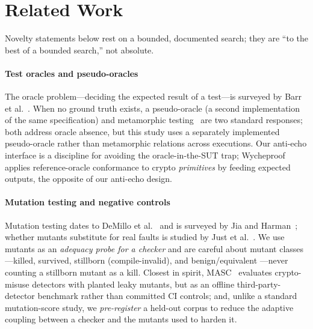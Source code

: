 \documentclass[conference]{IEEEtran}
\begin{document}
\section{Related Work}
\label{sec:related}
Novelty statements below rest on a bounded, documented search; they are ``to the best of a
bounded search,'' not absolute.

\paragraph{Test oracles and pseudo-oracles}
The oracle problem---deciding the expected result of a test---is surveyed by Barr et
al.~\cite{oracleproblem}. When no ground truth exists, a pseudo-oracle (a second
implementation of the same specification) and metamorphic testing~\cite{metamorphic} are two
standard responses; both address oracle absence, but this study uses a separately implemented
pseudo-oracle rather than metamorphic relations across executions. Our anti-echo interface is
a discipline for avoiding the oracle-in-the-SUT trap; Wycheproof applies reference-oracle
conformance to crypto \emph{primitives} by feeding expected outputs, the opposite of our
anti-echo design.

\paragraph{Mutation testing and negative controls}
Mutation testing dates to DeMillo et al.~\cite{demillo1978} and is surveyed by Jia and
Harman~\cite{jiaharman}; whether mutants substitute for real faults is studied by Just et
al.~\cite{just2014}. We use mutants as an \emph{adequacy probe for a checker} and are careful
about mutant classes---killed, survived, stillborn (compile-invalid), and benign/equivalent
---never counting a stillborn mutant as a kill. Closest in spirit, MASC~\cite{masc} evaluates
crypto-misuse detectors with planted leaky mutants, but as an offline third-party-detector
benchmark rather than committed CI controls; and, unlike a standard mutation-score study, we
\emph{pre-register} a held-out corpus to reduce the adaptive coupling between a checker and
the mutants used to harden it.
\end{document}
